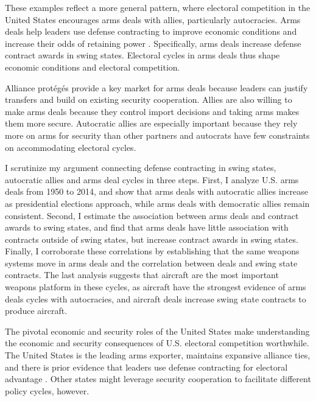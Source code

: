 \documentclass[12pt]{article}
\begin{document}
These examples reflect a more general pattern, where electoral competition in the United States encourages arms deals with allies, particularly autocracies.
Arms deals help leaders use defense contracting to improve economic conditions and increase their odds of retaining power \citep{Tufte1978, Mintz1988, Mayer1995, DerouenHeo2000, Becker2021}. 
Specifically, arms deals increase defense contract awards in swing states. 
Electoral cycles in arms deals thus shape economic conditions and electoral competition. 


Alliance prot{\'e}g{\'e}s provide a key market for arms deals because leaders can justify transfers and build on existing security cooperation. 
Allies are also willing to make arms deals because they control import decisions and taking arms makes them more secure. 
Autocratic allies are especially important because they rely more on arms for security than other partners \citep{McManusYarhi-Milo2017} and autocrats have few constraints on accommodating electoral cycles.


I scrutinize my argument connecting defense contracting in swing states, autocratic allies and arms deal cycles in three steps. 
First, I analyze U.S. arms deals from 1950 to 2014, and show that arms deals with autocratic allies increase as presidential elections approach, while arms deals with democratic allies remain consistent. 
Second, I estimate the association between arms deals and contract awards to swing states, and find that arms deals have little association with contracts outside of swing states, but increase contract awards in swing states. 
Finally, I corroborate these correlations by establishing that the same weapons systems move in arms deals and the correlation between deals and swing state contracts.
The last analysis suggests that aircraft are the most important weapons platform in these cycles, as aircraft have the strongest evidence of arms deals cycles with autocracies, and aircraft deals increase swing state contracts to produce aircraft.  


The pivotal economic and security roles of the United States make understanding the economic and security consequences of U.S. electoral competition worthwhile. 
The United States is the leading arms exporter, maintains expansive alliance ties, and there is prior evidence that leaders use defense contracting for electoral advantage \citep{DerouenHeo2000}. 
Other states might leverage security cooperation to facilitate different policy cycles, however. 
\end{document}
